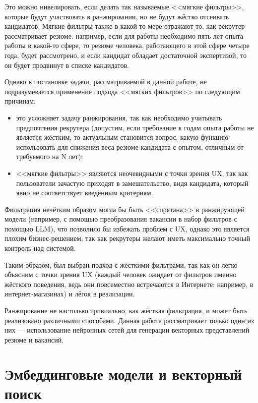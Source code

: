 \documentclass[14pt]{mmcs_article}
\begin{document}
Это можно нивелировать, если делать так называемые <<мягкие фильтры>>, которые будут участвовать в ранжировании, но не будут жёстко отсеивать кандидатов. Мягкие фильтры также в какой-то мере отражают то, как рекрутер рассматривает резюме: например, если для работы необходимо пять лет опыта работы в какой-то сфере, то резюме человека, работающего в этой сфере четыре года, будет рассмотрено, и если кандидат обладает достаточной экспертизой, то он будет продвинут в списке кандидатов.

Однако в постановке задачи, рассматриваемой в данной работе, не подразумевается применение подхода <<мягких фильтров>> по следующим причинам:

\begin{itemize}
  \item это усложняет задачу ранжирования, так как необходимо учитывать предпочтения рекрутера (допустим, если требование к годам опыта работы не является жёстким, то актуальным становится вопрос, какую функцию использовать для снижения веса резюме кандидата с опытом, отличным от требуемого на N лет);
  \item <<мягкие фильтры>> являются неочевидными с точки зрения UX, так как пользователи зачастую приходят в замешательство, видя кандидата, который явно не соответствует введённым критериям.
\end{itemize}

Фильтрация нечётким образом могла бы быть <<спрятана>> в ранжирующей модели (например, с помощью преобразования вакансии в набор фильтров с помощью LLM), что позволило бы избежать проблем с UX, однако это является плохим бизнес-решением, так как рекрутеры желают иметь максимально точный контроль над системой.

Таким образом, был выбран подход с жёсткими фильтрами, так как он легко объясним с точки зрения UX (каждый человек ожидает от фильтров именно жёсткого поведения, ведь они повсеместно встречаются в Интернете: например, в интернет-магазинах) и лёгок в реализации.

Ранжирование не настолько тривиально, как жёсткая фильтрация, и может быть реализовано различными способами. Данная работа рассматривает только один из них --- использование нейронных сетей для генерации векторных представлений резюме и вакансий.


\newpage
\section{Эмбеддинговые модели и векторный поиск}\label{embedding_models}
\end{document}
